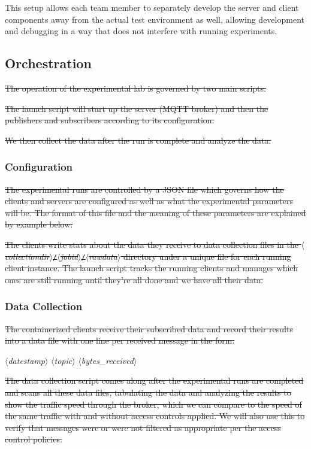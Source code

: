 \documentclass[sigconf, nonacm]{acmart}
\newcommand\var[1]{$\langle$\textit{#1}$\rangle$}
\begin{document}
This setup allows each team member to separately develop the server and client components away from the actual test environment as well, allowing development and debugging in a way that does not interfere with running experiments.

\subsection{Orchestration}
\sout{The operation of the experimental lab is governed by two main scripts.}

\sout{The launch script will start up the server (MQTT broker) and then the publishers and subscribers according to its configuration.}

\sout{We then collect the data after the run is complete and analyze the data.}

\subsubsection{Configuration}
\sout{The experimental runs are controlled by a JSON file which governs how the clients and servers are configured as well as what the experimental parameters will be. The format of this file and the meaning of these parameters are explained by example below:}

\sout{The clients write stats about the data they receive to data collection files in the \var{collectiondir}{\tt/}\var{jobid}{\tt/}\var{rawdata} directory under a unique file for each running client instance. The launch script tracks the running clients and manages
which ones are still running until they're all done and we have all their data.}

\subsubsection{Data Collection}
\sout{The containerized clients receive their subscribed data and record their results into a data file with one line per received message in the form:}

\begin{center}
\var{datestamp} \var{topic} \var{bytes\_received}
\end{center}

\sout{The data collection script comes along after the experimental runs are completed and scans all these data files, tabulating the data and
analyzing the results to show the traffic speed through the broker,
which we can compare to the speed of the same traffic with and without
access controls applied. We will also use this to verify that messages
were or were not filtered as appropriate per the access control policies.}
\end{document}
